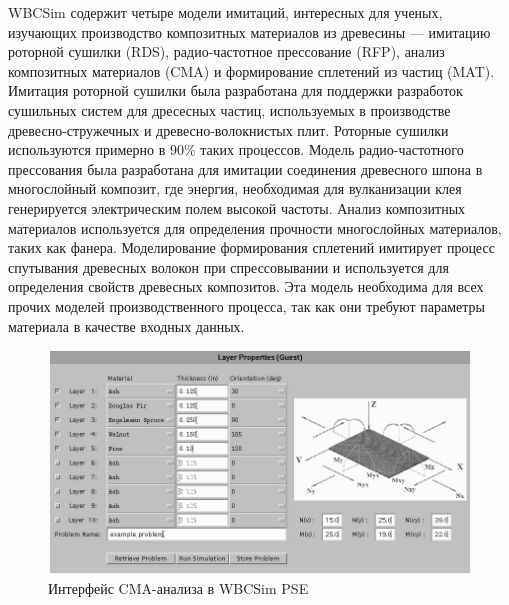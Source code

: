 WBCSim содержит четыре модели имитаций, интересных для ученых, изучающих производство композитных материалов из древесины --- имитацию роторной сушилки (RDS), радио-частотное прессование (RFP), анализ композитных материалов (CMA) и формирование сплетений из частиц (MAT). Имитация роторной сушилки была разработана для поддержки разработок сушильных систем для дресесных частиц, используемых в производстве древесно-стружечных и древесно-волокнистых плит. Роторные сушилки используются примерно в 90\% таких процессов. Модель радио-частотного прессования была разработана для имитации соединения древесного шпона в многослойный композит, где энергия, необходимая для вулканизации клея генерируется электрическим полем высокой частоты. Анализ композитных материалов используется для определения прочности многослойных материалов, таких как фанера. Моделирование формирования сплетений имитирует процесс спутывания древесных волокон при спрессовывании и используется для определения свойств древесных композитов. Эта модель необходима для всех прочих моделей производственного процесса, так как они требуют параметры материала в качестве входных данных.

\begin{figure}
  \centering
  	\includegraphics[width=14cm]{images/wbcsim-screenshot.png}
	\caption{Интерфейс CMA-анализа в WBCSim PSE}
	\label{fig:wbcsim-screenshot}
\end{figure} 

